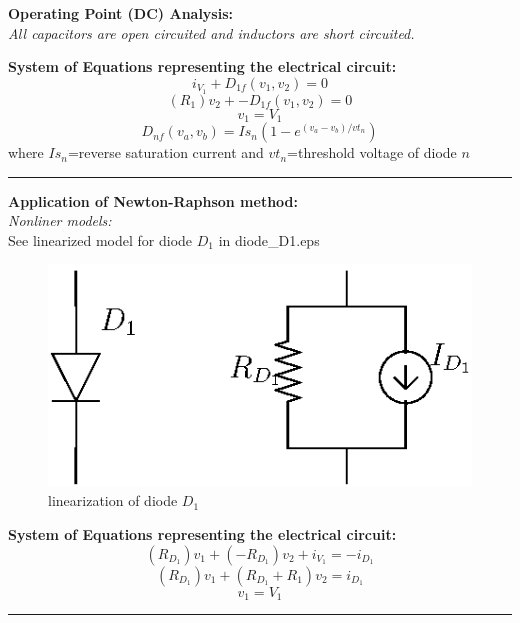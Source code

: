 \documentclass[a4paper,10pt]{report}
\begin{document}
{\bf Operating Point (DC) Analysis: } \\
{\it All capacitors are open circuited and inductors are short circuited.} 
\vspace{2mm}

{\bf System of Equations representing the electrical circuit:}
\begin{equation}
     i_{V_1} + D_{1f}(v_1,v_2) = 0 
\end{equation}
\begin{equation}
     (R_1)v_2 + -D_{1f}(v_1,v_2) = 0 
\end{equation}
\begin{equation}
     v_1 = V_1
\end{equation}
\vspace{2mm}
$$ D_{nf}(v_a,v_b)=Is_n(1-e^{(v_a-v_b)/vt_n})$$
 where $Is_n$=reverse saturation current and $vt_n$=threshold voltage of diode $n$\\
\hrule\vspace{5mm}

{\bf Application of Newton-Raphson method: }\\
\vspace{2mm}
{\it Nonliner models: }\\   
See linearized model for diode $D_1$ in diode\_D1.eps
\begin{figure}[h]
\centering
\includegraphics{diode_D1.eps}
\caption{linearization of diode $D_1$}
\end{figure}
\vspace{2mm}

{\bf System of Equations representing the electrical circuit:}\\
\begin{equation}
     (R_{D_1})v_1 + (-R_{D_1})v_2 + i_{V_1} = -i_{D_1} 
\end{equation}
\begin{equation}
    (R_{D_1})v_1 + (R_{D_1}+R_1)v_2 = i_{D_1} 
\end{equation}
\begin{equation}
     v_1 = V_1
\end{equation}
\hrule\vspace{5mm}
\end{document}
